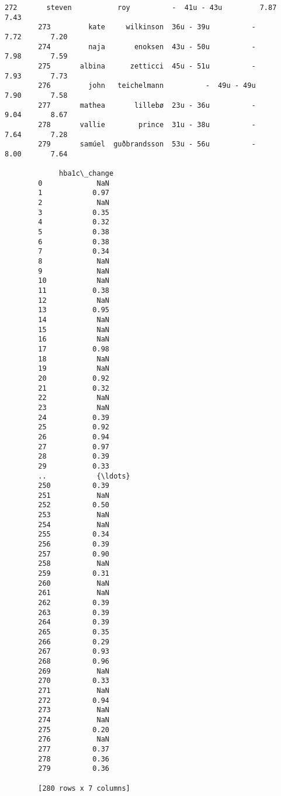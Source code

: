 \documentclass[11pt]{article}
\begin{document}
\begin{Verbatim}[commandchars=\\\{\}]
        272       steven           roy          -  41u - 43u         7.87       7.43   
        273         kate     wilkinson  36u - 39u          -         7.72       7.20   
        274         naja       enoksen  43u - 50u          -         7.98       7.59   
        275       albina      zetticci  45u - 51u          -         7.93       7.73   
        276         john   teichelmann          -  49u - 49u         7.90       7.58   
        277       mathea       lillebø  23u - 36u          -         9.04       8.67   
        278       vallie        prince  31u - 38u          -         7.64       7.28   
        279       samúel  guðbrandsson  53u - 56u          -         8.00       7.64   
        
             hba1c\_change  
        0             NaN  
        1            0.97  
        2             NaN  
        3            0.35  
        4            0.32  
        5            0.38  
        6            0.38  
        7            0.34  
        8             NaN  
        9             NaN  
        10            NaN  
        11           0.38  
        12            NaN  
        13           0.95  
        14            NaN  
        15            NaN  
        16            NaN  
        17           0.98  
        18            NaN  
        19            NaN  
        20           0.92  
        21           0.32  
        22            NaN  
        23            NaN  
        24           0.39  
        25           0.92  
        26           0.94  
        27           0.97  
        28           0.39  
        29           0.33  
        ..            {\ldots}  
        250          0.39  
        251           NaN  
        252          0.50  
        253           NaN  
        254           NaN  
        255          0.34  
        256          0.39  
        257          0.90  
        258           NaN  
        259          0.31  
        260           NaN  
        261           NaN  
        262          0.39  
        263          0.39  
        264          0.39  
        265          0.35  
        266          0.29  
        267          0.93  
        268          0.96  
        269           NaN  
        270          0.33  
        271           NaN  
        272          0.94  
        273           NaN  
        274           NaN  
        275          0.20  
        276           NaN  
        277          0.37  
        278          0.36  
        279          0.36  
        
        [280 rows x 7 columns]
\end{Verbatim}
            
\end{document}

